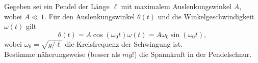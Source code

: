 \begin{Exercise}[title = Seilkraft, origin = {Morin - Classical Mechanics}, difficulty = 3, label = pucks]
Gegeben sei ein Pendel der Länge $\ell$ mit maximalem Auslenkungswinkel $A$, wobei $A \ll 1$. Für den Auslenkungswinkel $\theta(t)$ und die Winkelgeschwindigkeit $\omega(t)$ gilt 
\begin{subequations}\label{averagetension:simpleharmonic}
	\begin{equation}\label{averagetension:angle}
		\theta(t) = A\cos\left(\omega_0t\right)
	\end{equation}
	\begin{equation}\label{averagtension:angularvel}
		\omega(t) = A\omega_0\sin\left(\omega_0t\right),
	\end{equation}
\end{subequations}
wobei $\omega_0 = \sqrt{g/\ell}$ die Kreisfrequenz der Schwingung ist.\\
Bestimme näherungsweise (besser als $mg$!) die Spannkraft in der Pendelschnur.
\end{Exercise}